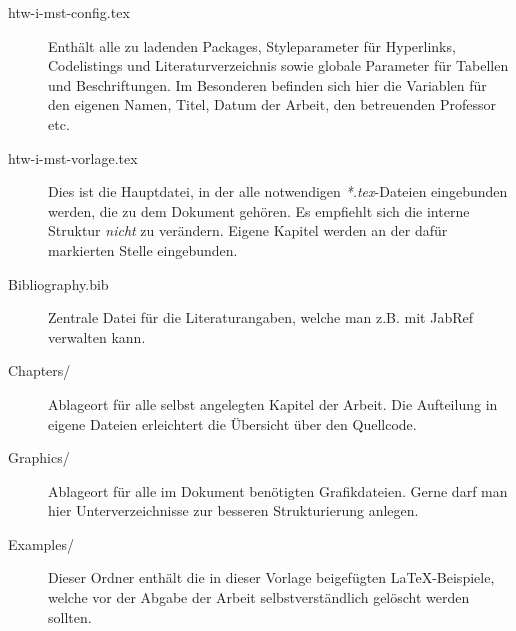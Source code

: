 

\begin{description}
 \item [htw-i-mst-config.tex] Enthält alle zu ladenden Packages, Styleparameter für Hyperlinks, Codelistings und Literaturverzeichnis sowie globale Parameter 
 für Tabellen und Beschriftungen. Im Besonderen befinden sich hier die Variablen für den eigenen Namen, Titel, Datum der Arbeit, den betreuenden Professor etc.
 
 \item [htw-i-mst-vorlage.tex] Dies ist die Hauptdatei, in der alle notwendigen \textit{*.tex}-Dateien eingebunden werden, die zu dem Dokument gehören. Es empfiehlt sich
 die interne Struktur \textit{nicht} zu verändern. Eigene Kapitel werden an der dafür markierten Stelle eingebunden.
     
 \item [Bibliography.bib] Zentrale Datei für die Literaturangaben, welche man z.B. mit JabRef verwalten kann. 

 \item [Chapters/] Ablageort für alle selbst angelegten Kapitel der Arbeit. Die Aufteilung in eigene Dateien erleichtert die Übersicht über den Quellcode. 
 
 \item [Graphics/] Ablageort für alle im Dokument benötigten Grafikdateien. Gerne darf man hier Unterverzeichnisse zur besseren Strukturierung anlegen.
 
 \item [Examples/] Dieser Ordner enthält die in dieser Vorlage beigefügten LaTeX-Beispiele, welche vor der Abgabe der Arbeit selbstverständlich gelöscht werden sollten.
 

\end{description}
